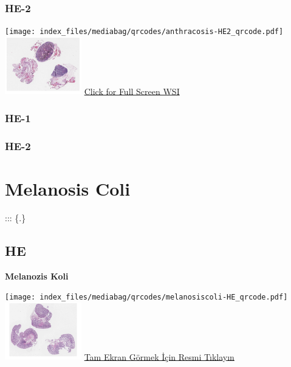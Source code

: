 \documentclass[
  letterpaper,
  DIV=11,
  numbers=noendperiod]{scrreprt}
\begin{document}
\subsubsection{HE-2}\label{he-2}

\texttt{[image: index\_files/mediabag/qrcodes/anthracosis-HE2\_qrcode.pdf]}
\href{https://images.patolojiatlasi.com/anthracosis/HE2.html}{\includegraphics[width=0.25\textwidth,height=\textheight]{./screenshots/thumbnail_anthracosis2.png}}
\href{https://images.patolojiatlasi.com/anthracosis/HE2.html}{Click for
Full Screen WSI}

\subsubsection{HE-1}\label{he-1-1}

\subsubsection{HE-2}\label{he-2-1}

\section{Melanosis Coli}\label{sec-melanosis-coli}

::: \{.\}

\subsection{HE}\label{he-3}

\textbf{Melanozis Koli}

\texttt{[image: index\_files/mediabag/qrcodes/melanosiscoli-HE\_qrcode.pdf]}
\href{https://images.patolojiatlasi.com/melanosiscoli/HE.html}{\includegraphics[width=0.25\textwidth,height=\textheight]{./screenshots/thumbnail_melanosiscoli-HE.png}}
\href{https://images.patolojiatlasi.com/melanosiscoli/HE.html}{Tam Ekran
Görmek İçin Resmi Tıklayın}
\end{document}
